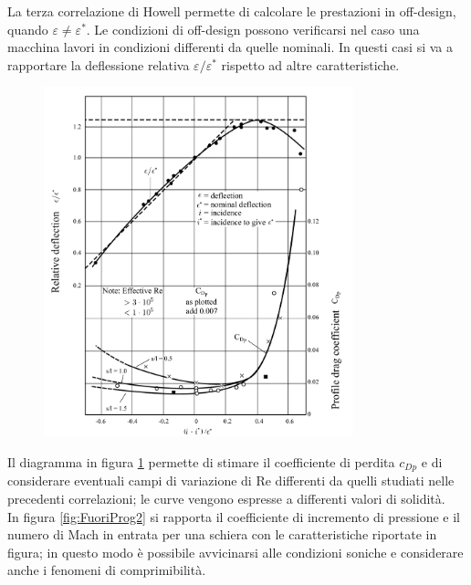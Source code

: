 La terza correlazione di Howell permette di calcolare le prestazioni in off-design, quando $\varepsilon \neq \varepsilon^*$. Le condizioni di off-design possono verificarsi nel caso una macchina lavori in condizioni differenti da quelle nominali. In questi casi si va a rapportare la deflessione relativa $\varepsilon/\varepsilon^*$ rispetto ad altre caratteristiche.
\begin{figure}
\centering
  \includegraphics[width=0.8\textwidth]{fig/FuoriProg1.pdf}
\caption{}
\label{fig:FuoriProg1}
\end{figure}
Il diagramma in figura \ref{fig:FuoriProg1} permette di stimare il coefficiente di perdita $c_{Dp}$ e di considerare eventuali campi di variazione di Re differenti da quelli studiati nelle precedenti correlazioni; le curve vengono espresse a differenti valori di solidità.\\
In figura \ref{fig:FuoriProg2} si rapporta il coefficiente di incremento di pressione e il numero di Mach in entrata per una schiera con le caratteristiche riportate in figura; in questo modo è possibile avvicinarsi alle condizioni soniche e considerare anche i fenomeni di comprimibilità.
